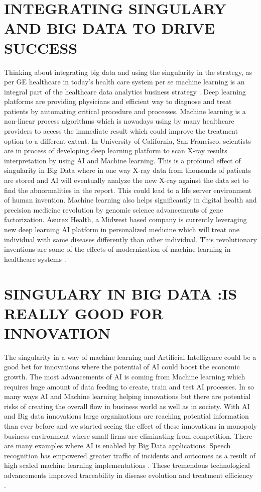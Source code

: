 \documentclass[sigconf]{acmart}
\begin{document}
\section{INTEGRATING SINGULARY AND BIG DATA TO DRIVE SUCCESS}
Thinking about integrating big data and using the singularity in the strategy, as per GE healthcare in today’s health care system per se machine learning is an integral part of the healthcare data analytics business strategy \cite{editor02}. Deep learning platforms are providing physicians and efficient way to diagnose and treat patients by automating critical procedure and processes. Machine learning is a non-linear process algorithms which is nowadays using by many healthcare providers to access the immediate result which could improve the treatment option to a different extent. In University of California, San Francisco, scientists are in process of developing deep learning platform to scan X-ray results interpretation by using AI and Machine learning. This is a profound effect of singularity in Big Data where in one way X-ray data from thousands of patients are stored and AI will eventually analyze the new X-ray against the data set to find the abnormalities in the report. This could lead to a life server environment of human invention. Machine learning also helps significantly in digital health and precision medicine revolution by genomic science advancements of gene factorization. Asurex Health, a Midwest based company is currently leveraging new deep learning AI platform in personalized medicine which will treat one individual with same diseases differently than other individual. This revolutionary inventions are some of the effects of modernization of machine learning in healthcare systems \cite{editor02}.

\section{SINGULARY IN BIG DATA :IS REALLY GOOD FOR INNOVATION}
The singularity in a way of machine learning and Artificial Intelligence could be a good bet for innovations where the potential of AI could boost the economic growth. The most advancements of AI is coming from Machine learning which requires huge amount of data feeding to create, train and test AI processes. In so many ways AI and Machine learning helping innovations but there are potential risks of creating the overall flow in business world as well as in society. With AI and Big data innovations large organizations are reaching potential information than ever before and we started seeing the effect of these innovations in monopoly business environment where small firms are eliminating from competition. There are many examples where AI is enabled by Big Data applications. Speech recognition  has empowered greater traffic of incidents and outcomes as a result of high scaled machine learning implementations \cite{editor03}. These tremendous technological advancements improved traceability in disease evolution and treatment efficiency \cite{editor03}.
\end{document}
